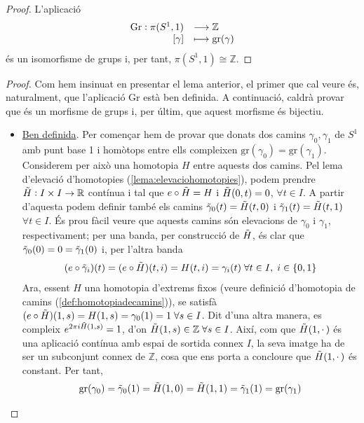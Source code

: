 \documentclass[../main.tex]{subfiles}
\begin{document}
\begin{ter}
\label{ter:grupfonamentalcircumferencia}
\end{ter}
\begin{proof}
L'aplicació
\begin{equation}
    \notag
    \begin{array}{rl}
        \mathrm{Gr}:\pi(S^1,1) & \longrightarrow\mathbb{Z} \\
        \left[\gamma\right] & \longmapsto \mathrm{gr}(\gamma)
    \end{array}
\end{equation}
és un isomorfisme de grups i, per tant, $\pi(S^1,1)\cong \mathbb{Z}$.
\end{proof}
\begin{proof}
Com hem insinuat en presentar el lema anterior, el primer que cal veure és, naturalment, que l'aplicació Gr està ben definida. A continuació, caldrà provar que és un morfisme de grups i, per últim, que aquest morfisme és bijectiu.
\begin{itemize}
    \item \underline{Ben definida}. Per començar hem de provar que donats dos camins $\gamma_0,\gamma_1$ de $S^1$ amb punt base 1 i homòtops entre ells compleixen $\mathrm{gr}(\gamma_0) = \mathrm{gr}(\gamma_1)$. Considerem per això una homotopia $H$ entre aquests dos camins. Pel lema d'elevació d'homotopies (\ref{lema:elevaciohomotopies}), podem prendre $\Tilde{H}:I\times I\rightarrow\mathbb{R}$ contínua i tal que $e\circ \Tilde{H} = H$ i $\Tilde{H}(0,t) = 0$, $\forall t\in I$. A partir d'aquesta podem definir també els camins $\Tilde{\gamma}_0(t) = \Tilde{H}(t,0)$ i $\Tilde{\gamma}_1(t) = \Tilde{H}(t,1)$ $\forall t\in I$. És prou fàcil veure que aquests camins són elevacions de $\gamma_0$ i $\gamma_1$, respectivament; per una banda, per construcció de $\Tilde{H}$, és clar que $\Tilde{\gamma}_0(0) = 0 = \Tilde{\gamma}_1(0)$ i, per l'altra banda
    \begin{equation}
        \notag
        (e\circ\Tilde{\gamma}_i)(t) = (e\circ \Tilde{H})(t,i) = H(t,i) = \gamma_i(t) \;\forall t\in I,\;i\in\{0,1\}
    \end{equation}
    Ara, essent $H$ una homotopia d'extrems fixos (veure definició d'homotopia de camins (\ref{def:homotopiadecamins})), se satisfà $(e\circ \Tilde{H})(1,s) = H(1,s) = \gamma_0(1)=1\;\forall s\in I$. Dit d'una altra manera, es compleix $e^{2\pi i\Tilde{H}(1,s)} = 1$, d'on $\Tilde{H}(1,s)\in\mathbb{Z}\;\forall s\in I$. Així, com que $\Tilde{H}(1,\cdotp)$ és una aplicació contínua amb espai de sortida connex $I$, la seva imatge ha de ser un subconjunt connex de $\mathbb{Z}$, cosa que ens porta a concloure que $\Tilde{H}(1,\cdotp)$ és constant. Per tant,
    \begin{equation}
        \notag
        \mathrm{gr}(\gamma_0)= \Tilde{\gamma}_0(1) = \Tilde{H}(1,0) = \Tilde{H}(1,1) = \Tilde{\gamma}_1(1) = \mathrm{gr}(\gamma_1)
    \end{equation}
    

\end{itemize}
\end{proof}
\end{document}
